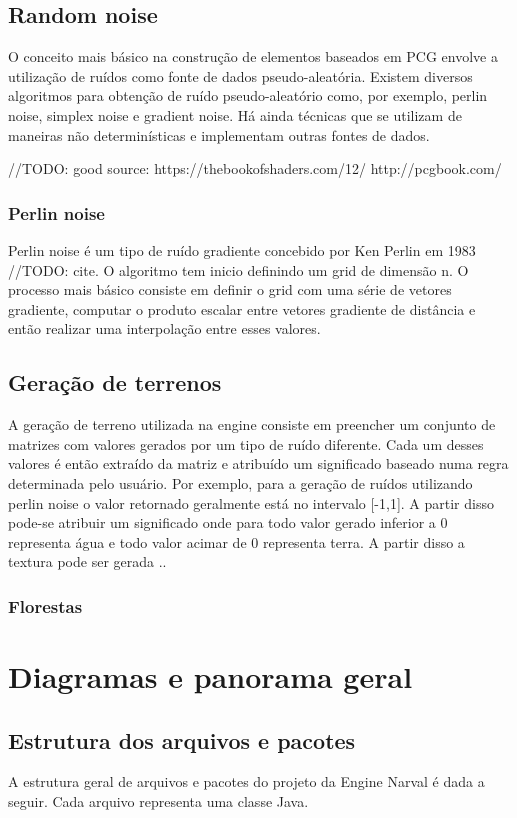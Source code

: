 \documentclass[12pt, 
openright, 
oneside, 
a4paper,    
brazil]{facom-ufu-abntex2}
\begin{document}
\section{Random noise}
O conceito mais básico na construção de elementos baseados em PCG envolve a utilização de ruídos como fonte de dados pseudo-aleatória. Existem diversos algoritmos para obtenção de ruído pseudo-aleatório como, por exemplo, perlin noise, simplex noise e gradient noise. Há ainda técnicas que se utilizam de maneiras não determinísticas e implementam outras fontes de dados.

//TODO: good source: https://thebookofshaders.com/12/ http://pcgbook.com/

\subsection{Perlin noise}
Perlin noise é um tipo de ruído gradiente concebido por Ken Perlin em 1983 //TODO: cite. O algoritmo tem inicio definindo um grid de dimensão n. O processo mais básico consiste em definir o grid com uma série de vetores gradiente, computar o produto escalar entre vetores gradiente de distância e então realizar uma interpolação entre esses valores.

\section{Geração de terrenos}
A geração de terreno utilizada na engine consiste em preencher um conjunto de matrizes com valores gerados por um tipo de ruído diferente. Cada um desses valores é então extraído da matriz e atribuído um significado baseado numa regra determinada pelo usuário. Por exemplo, para a geração de ruídos utilizando perlin noise o valor retornado geralmente está no intervalo [-1,1]. A partir disso pode-se atribuir um significado onde para todo valor gerado inferior a 0 representa água e todo valor acimar de 0 representa terra. A partir disso a textura pode ser gerada ..

\subsection{Florestas}

\chapter{Diagramas e panorama geral}
\section{Estrutura dos arquivos e pacotes}
A estrutura geral de arquivos e pacotes do projeto da Engine Narval é dada a seguir. Cada arquivo representa uma classe Java.
\end{document}
